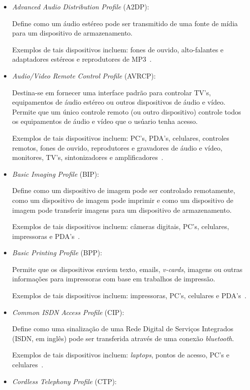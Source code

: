 \begin{itemize}
	\item \emph{Advanced Audio Distribution Profile} (A2DP): 

	Define como um áudio estéreo pode ser transmitido de uma fonte de mídia para um dispositivo de armazenamento.

	Exemplos de tais dispositivos incluem: fones de ouvido, alto-falantes e adaptadores estéreos e reprodutores de MP3~\cite{bluetoothprofilesA2DP}.
	\item \emph{Audio/Video Remote Control Profile} (AVRCP): 

	Destina-se em fornecer uma interface padrão para controlar TV's, equipamentos de áudio estéreo ou outros dispositivos de áudio e vídeo. Permite que um único controle remoto (ou outro dispositivo) controle todos os equipamentos de áudio e vídeo que o usúario tenha acesso.

	Exemplos de tais dispositivos incluem: PC's, PDA's, celulares, controles remotos, fones de ouvido, reprodutores e gravadores de áudio e vídeo, monitores, TV's, sintonizadores e amplificadores~\cite{bluetoothprofilesAVRCP}.
	\item \emph{Basic Imaging Profile} (BIP): 

	Define como um dispositivo de imagem pode ser controlado remotamente, como um dispositivo de imagem pode imprimir e como um dispositivo de imagem pode transferir imagens para um dispositivo de armazenamento.

	Exemplos de tais dispositivos incluem: câmeras digitais, PC's, celulares, impressoras e PDA's~\cite{bluetoothprofilesBIP}.
	\item \emph{Basic Printing Profile} (BPP): 

	Permite que os dispositivos enviem texto, emails, \emph{v-cards}, imagens ou outras informações para impressoras com base em trabalhos de impressão.
	
	Exemplos de tais dispositivos incluem: impressoras, PC's, celulares e PDA's~\cite{bluetoothprofilesBPP}.
	\item \emph{Common ISDN Access Profile} (CIP): 

	Define como uma sinalização de uma Rede Digital de Serviços Integrados (ISDN, em inglês) pode ser transferida através de uma conexão \emph{bluetooth}.

	Exemplos de tais dispositivos incluem: \emph{laptops}, pontos de acesso, PC's e celulares~\cite{bluetoothprofilesCIP}.
	\item \emph{Cordless Telephony Profile} (CTP): 


\end{itemize}

